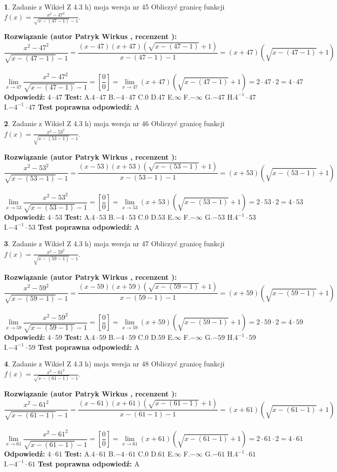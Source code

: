 \documentclass[12pt, a4paper]{article}
\theoremstyle{definition} %
\newtheorem{zad}{}
\newcommand{\zadStart}[1]{\begin{zad}#1\newline}
\newcommand{\zadStop}{\end{zad}}
\newcommand{\rozwStart}[2]{\noindent \textbf{Rozwiązanie (autor #1 , recenzent #2): }\newline}
\newcommand{\rozwStop}{\newline}
\newcommand{\odpStart}{\noindent \textbf{Odpowiedź:}\newline}
\newcommand{\odpStop}{\newline}
\newcommand{\testStart}{\noindent \textbf{Test:}\newline}
\newcommand{\testStop}{\newline}
\newcommand{\kluczStart}{\noindent \textbf{Test poprawna odpowiedź:}\newline}
\newcommand{\kluczStop}{\newline}
\begin{document}
\zadStart{Zadanie z Wikieł Z 4.3 h) moja wersja nr 45}
Obliczyć granicę funkcji $f(x)=\frac{x^{2} - 47^{2}}{\sqrt{x-(47-1)}-1}$.
\zadStop
\rozwStart{Patryk Wirkus}{}
$$\frac{x^{2} - 47^{2}}{\sqrt{x-(47-1)}-1}=\frac{(x-47)(x+47)(\sqrt{x-(47-1)}+1)}{x-(47-1)-1}=(x+47)(\sqrt{x-(47-1)}+1)$$
\\
$$\lim\limits_{x\to 47}\frac{x^{2} - 47^{2}}{\sqrt{x-(47-1)}-1}=[\frac{0}{0}]=
\lim\limits_{x\to 47}(x+47)(\sqrt{x-(47-1)}+1) = 2\cdot47 \cdot 2 = 4 \cdot 47$$
\rozwStop
\odpStart
$4\cdot47$
\odpStop
\testStart
A.$4\cdot47$
B.$-4\cdot47$
C.$0$
D.$47$
E.$\infty$
F.$-\infty$
G.$-47$
H.$4^{-1}\cdot47$
I.$-4^{-1}\cdot47$
\testStop
\kluczStart
A
\kluczStop



\zadStart{Zadanie z Wikieł Z 4.3 h) moja wersja nr 46}
Obliczyć granicę funkcji $f(x)=\frac{x^{2} - 53^{2}}{\sqrt{x-(53-1)}-1}$.
\zadStop
\rozwStart{Patryk Wirkus}{}
$$\frac{x^{2} - 53^{2}}{\sqrt{x-(53-1)}-1}=\frac{(x-53)(x+53)(\sqrt{x-(53-1)}+1)}{x-(53-1)-1}=(x+53)(\sqrt{x-(53-1)}+1)$$
\\
$$\lim\limits_{x\to 53}\frac{x^{2} - 53^{2}}{\sqrt{x-(53-1)}-1}=[\frac{0}{0}]=
\lim\limits_{x\to 53}(x+53)(\sqrt{x-(53-1)}+1) = 2\cdot53 \cdot 2 = 4 \cdot 53$$
\rozwStop
\odpStart
$4\cdot53$
\odpStop
\testStart
A.$4\cdot53$
B.$-4\cdot53$
C.$0$
D.$53$
E.$\infty$
F.$-\infty$
G.$-53$
H.$4^{-1}\cdot53$
I.$-4^{-1}\cdot53$
\testStop
\kluczStart
A
\kluczStop



\zadStart{Zadanie z Wikieł Z 4.3 h) moja wersja nr 47}
Obliczyć granicę funkcji $f(x)=\frac{x^{2} - 59^{2}}{\sqrt{x-(59-1)}-1}$.
\zadStop
\rozwStart{Patryk Wirkus}{}
$$\frac{x^{2} - 59^{2}}{\sqrt{x-(59-1)}-1}=\frac{(x-59)(x+59)(\sqrt{x-(59-1)}+1)}{x-(59-1)-1}=(x+59)(\sqrt{x-(59-1)}+1)$$
\\
$$\lim\limits_{x\to 59}\frac{x^{2} - 59^{2}}{\sqrt{x-(59-1)}-1}=[\frac{0}{0}]=
\lim\limits_{x\to 59}(x+59)(\sqrt{x-(59-1)}+1) = 2\cdot59 \cdot 2 = 4 \cdot 59$$
\rozwStop
\odpStart
$4\cdot59$
\odpStop
\testStart
A.$4\cdot59$
B.$-4\cdot59$
C.$0$
D.$59$
E.$\infty$
F.$-\infty$
G.$-59$
H.$4^{-1}\cdot59$
I.$-4^{-1}\cdot59$
\testStop
\kluczStart
A
\kluczStop



\zadStart{Zadanie z Wikieł Z 4.3 h) moja wersja nr 48}
Obliczyć granicę funkcji $f(x)=\frac{x^{2} - 61^{2}}{\sqrt{x-(61-1)}-1}$.
\zadStop
\rozwStart{Patryk Wirkus}{}
$$\frac{x^{2} - 61^{2}}{\sqrt{x-(61-1)}-1}=\frac{(x-61)(x+61)(\sqrt{x-(61-1)}+1)}{x-(61-1)-1}=(x+61)(\sqrt{x-(61-1)}+1)$$
\\
$$\lim\limits_{x\to 61}\frac{x^{2} - 61^{2}}{\sqrt{x-(61-1)}-1}=[\frac{0}{0}]=
\lim\limits_{x\to 61}(x+61)(\sqrt{x-(61-1)}+1) = 2\cdot61 \cdot 2 = 4 \cdot 61$$
\rozwStop
\odpStart
$4\cdot61$
\odpStop
\testStart
A.$4\cdot61$
B.$-4\cdot61$
C.$0$
D.$61$
E.$\infty$
F.$-\infty$
G.$-61$
H.$4^{-1}\cdot61$
I.$-4^{-1}\cdot61$
\testStop
\kluczStart
A
\kluczStop
\end{document}
